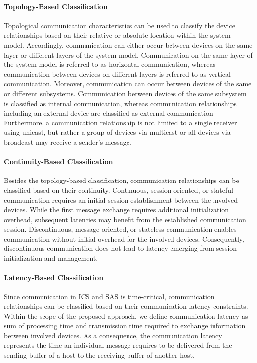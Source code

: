 \paragraph{Topology-Based Classification}
Topological communication characteristics can be used to classify the device relationships based on their relative or absolute location within the system model.
Accordingly, communication can either occur between devices on the same layer or different layers of the system model.
Communication on the same layer of the system model is referred to as horizontal communication, whereas communication between devices on different layers is referred to as vertical communication.
Moreover, communication can occur between devices of the same or different subsystems.
Communication between devices of the same subsystem is classified as internal communication, whereas communication relationships including an external device are classified as external communication.
Furthermore, a communication relationship is not limited to a single receiver using unicast, but rather a group of devices via multicast or all devices via broadcast may receive a sender's message.

\paragraph{Continuity-Based Classification}
Besides the topology-based classification, communication relationships can be classified based on their continuity.
Continuous, session-oriented, or stateful communication requires an initial session establishment between the involved devices.
While the first message exchange requires additional initialization overhead, subsequent latencies may benefit from the established communication session.
Discontinuous, message-oriented, or stateless communication enables communication without initial overhead for the involved devices.
Consequently, discontinuous communication does not lead to latency emerging from session initialization and management.

\paragraph{Latency-Based Classification}
Since communication in ICS and SAS is time-critical, communication relationships can be classified based on their communication latency constraints.
Within the scope of the proposed approach, we define communication latency as sum of processing time and transmission time required to exchange information between involved devices.
As a consequence, the communication latency represents the time an individual message requires to be delivered from the sending buffer of a host to the receiving buffer of another host.

